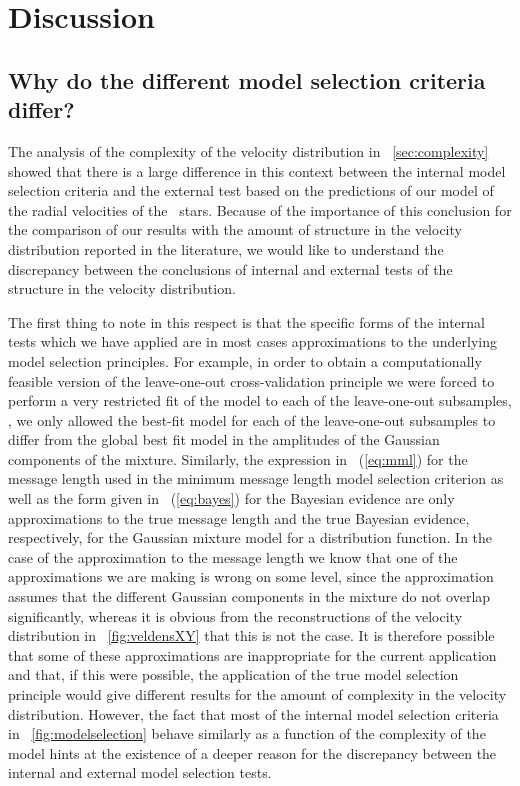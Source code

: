 \section{Discussion}

\subsection{Why do the different model selection criteria differ?}

The analysis of the complexity of the velocity distribution in
\sectionname~\ref{sec:complexity} showed that there is a large
difference in this context between the internal model selection
criteria and the external test based on the predictions of our model
of the radial velocities of the \gcsabb\ stars. Because of the
importance of this conclusion for the comparison of our results with
the amount of structure in the velocity distribution reported in the
literature, we would like to understand the discrepancy between the
conclusions of internal and external tests of the structure in the
velocity distribution.

The first thing to note in this respect is that the specific forms of
the internal tests which we have applied are in most cases
approximations to the underlying model selection principles. For
example, in order to obtain a computationally feasible version of the
leave-one-out cross-validation principle we were forced to perform a
very restricted fit of the model to each of the leave-one-out
subsamples, \ie, we only allowed the best-fit model for each of the
leave-one-out subsamples to differ from the global best fit model in
the amplitudes of the Gaussian components of the mixture. Similarly,
the expression in \eqnnumber~(\ref{eq:mml}) for the message length
used in the minimum message length model selection criterion as well
as the form given in \eqnnumber~(\ref{eq:bayes}) for the Bayesian
evidence are only approximations to the true message length and the
true Bayesian evidence, respectively, for the Gaussian mixture model
for a distribution function. In the case of the approximation to the
message length we know that one of the approximations we are making is
wrong on some level, since the approximation assumes that the
different Gaussian components in the mixture do not overlap
significantly, whereas it is obvious from the reconstructions of the
velocity distribution in \figurename~\ref{fig:veldensXY} that this is
not the case. It is therefore possible that some of these
approximations are inappropriate for the current application and that,
if this were possible, the application of the true model selection
principle would give different results for the amount of complexity in
the velocity distribution. However, the fact that most of the internal
model selection criteria in \figurename~\ref{fig:modelselection}
behave similarly as a function of the complexity of the model hints at
the existence of a deeper reason for the discrepancy between the
internal and external model selection tests.

